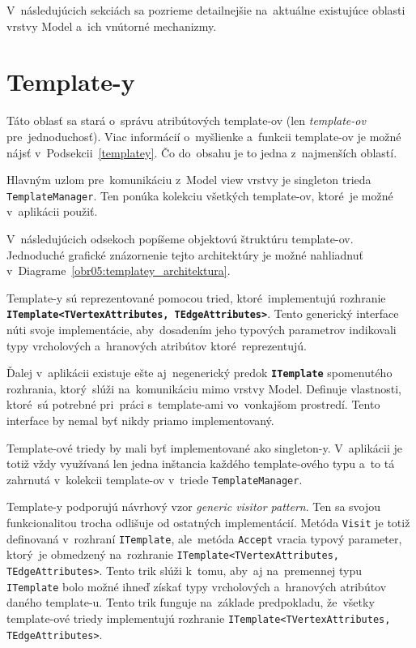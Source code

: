V~následujúcich sekciách sa pozrieme detailnejšie na~aktuálne existujúce oblasti vrstvy Model a~ich vnútorné mechanizmy.

\section{Template-y}

Táto oblasť sa stará o~správu atribútových template-ov (len \textit{template-ov} pre~jednoduchosť). Viac informácií o~myšlienke a~funkcii template-ov je možné nájsť v~Podsekcii~\ref{templatey}. Čo do~obsahu je to jedna z~najmenších oblastí.  

Hlavným uzlom pre~komunikáciu z~Model view vrstvy je singleton trieda \texttt{TemplateManager}. Ten ponúka kolekciu všetkých template-ov, ktoré~je možné v~aplikácii použiť. 

V~následujúcich odsekoch popíšeme objektovú štruktúru template-ov. Jednoduché grafické znázornenie tejto architektúry je možné nahliadnuť v~Diagrame~\ref{obr05:templatey_architektura}.   

\bigskip

Template-y sú reprezentované pomocou tried, ktoré~implementujú rozhranie \textbf{\texttt{ITemplate<TVertexAttributes, TEdgeAttributes>}}. Tento generický interface núti svoje implementácie, aby~dosadením jeho typových parametrov indikovali typy vrcholových a~hranových atribútov ktoré~reprezentujú. 

Ďalej v~aplikácii existuje ešte aj~negenerický predok \textbf{\texttt{ITemplate}} spomenutého rozhrania, ktorý~slúži na~komunikáciu mimo vrstvy Model. Definuje vlastnosti, ktoré~sú potrebné pri~práci s~template-ami vo~vonkajšom prostredí. Tento interface by nemal byť nikdy priamo implementovaný.

Template-ové triedy by mali byť implementované ako singleton-y. V~aplikácii je totiž vždy využívaná len jedna inštancia každého template-ového typu a~to tá zahrnutá v~kolekcii template-ov v~triede \texttt{TemplateManager}.

Template-y podporujú návrhový vzor \textit{generic visitor pattern}. Ten sa svojou funkcionalitou trocha odlišuje od ostatných implementácií. Metóda \texttt{Visit} je totiž definovaná v~rozhraní \texttt{ITemplate}, ale~metóda \texttt{Accept} vracia typový parameter, ktorý~je obmedzený na~rozhranie \texttt{ITemplate<TVertexAttributes, TEdgeAttributes>}. Tento trik slúži k~tomu, aby~aj na~premennej typu \texttt{ITemplate} bolo možné ihneď získať typy vrcholových a~hranových atribútov daného template-u. Tento trik funguje na~základe predpokladu, že~všetky template-ové triedy implementujú rozhranie \texttt{ITemplate<TVertexAttributes, TEdgeAttributes>}. 

